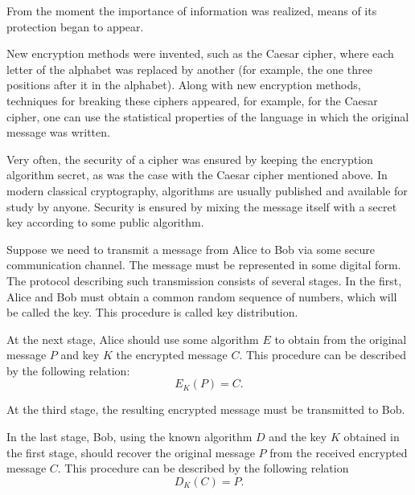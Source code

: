 From the moment the importance of information was realized, means of its protection began to appear. 

New encryption methods were invented, such as the Caesar cipher, where each letter
of the alphabet was replaced by another (for example, the one three positions after it
in the alphabet). Along with new encryption methods, techniques for breaking these ciphers appeared,
for example, for the Caesar cipher, one can use the statistical properties of the language in which
the original message was written.

Very often, the security of a cipher was ensured by keeping the encryption algorithm secret, as was the case
with the Caesar cipher mentioned above. In modern classical
cryptography, algorithms are usually published and available for study by anyone. Security
is ensured by mixing the message itself with a secret key
according to some public algorithm. 

Suppose we need to transmit a message from Alice to Bob via
some secure communication channel. The message must be
represented in some digital form.
The protocol describing such
transmission consists of several stages. In the first, Alice and Bob must
obtain a common random sequence of numbers, which will be called the key. This procedure is called key distribution. 

At the next stage, Alice should use
some algorithm $E$ to obtain from the original message $P$ and key $K$
the encrypted message $C$. This procedure can be described by the following relation: 
\begin{equation}
E_{K}\left(P\right) = C.
\label{eqPart3CryptoEncryptClass}
\end{equation}

At the third stage, the resulting encrypted message must be
transmitted to Bob.

In the last stage, Bob, using the known algorithm $D$ and the key $K$ obtained in
the first stage, should recover the original message $P$ from
the received encrypted message $C$. This procedure can be described
by the following relation
\begin{equation}
D_{K}\left(C\right) = P.
\label{eqPart3CryptoDeEncryptClass}
\end{equation}

